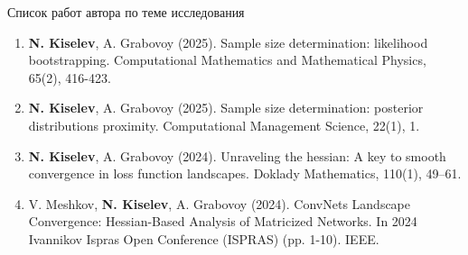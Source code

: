 \documentclass[aspectratio=169]{beamer}
\begin{document}
\begin{frame}{Список работ автора по теме исследования}
    \begin{enumerate}
        \item \textbf{N. Kiselev}, A. Grabovoy (2025). Sample size determination: likelihood bootstrapping. Computational Mathematics and Mathematical Physics, 65(2), 416-423.
        \item \textbf{N. Kiselev}, A. Grabovoy (2025). Sample size determination: posterior distributions proximity. Computational Management Science, 22(1), 1.
        \item \textbf{N. Kiselev}, A. Grabovoy (2024). Unraveling the hessian: A key to smooth convergence in loss function landscapes. Doklady Mathematics, 110(1), 49–61.
        \item V. Meshkov, \textbf{N. Kiselev}, A. Grabovoy (2024). ConvNets Landscape Convergence: Hessian-Based Analysis of Matricized Networks. In 2024 Ivannikov Ispras Open Conference (ISPRAS) (pp. 1-10). IEEE.
    \end{enumerate}
\end{frame}
\end{document}
